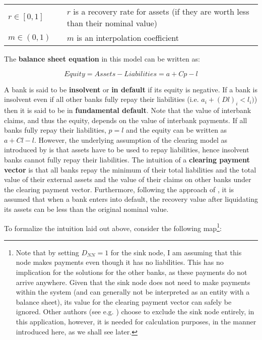 \documentclass[authoryear,12pt]{elsarticle}
\begin{document}
\begin{table}[htp!]
\begin{threeparttable}
\begin{center}
\begin{tabular}{l l p{8cm} }
		 $r \in [0,1]$ & & $r$ is a recovery rate for assets (if they are worth less than their nominal value)\\
         $m \in (0,1)$ & & $m$ is an interpolation coefficient \\


    \bottomrule  
    
\hline
\end{tabular}
\begin{tablenotes}
\item 
\end{tablenotes}
\end{center}
\end{threeparttable}
\end{table}

The \textbf{balance sheet equation} in this model can be written as:

\begin{equation}
Equity = Assets - Liabilities = a + Cp - l
\end{equation}

A bank is said to be \textbf{insolvent} or \textbf{in default} if its equity is negative. If a bank is insolvent even if all other banks fully repay their liabilities (i.e. $a_i + (Dl)_i < l_i)$) then it is said to be in \textbf{fundamental default}. Note that the value of interbank claims, and thus the equity, depends on the value of interbank payments. If all banks fully repay their liabilities, $p=l$ and the equity can be written as $a + Cl - l$. However, the underlying assumption of the clearing model as introduced by \cite{Eisenberg2001} is that assets have to be used to  repay liabilities, hence insolvent banks cannot fully repay their liabilities. The intuition of a \textbf{clearing payment vector} is that all banks repay the minimum of their total liabilities and the total value of their external assets and the value of their claims on other banks under the clearing payment vector. Furthermore, following the approach of \cite{Rogers2013}, it is assumed that when a bank enters into default, the recovery value after liquidating its assets can be less than the original nominal value.


To formalize the intuition laid out above, consider the following map\footnote{Note that by setting $D_{NN}=1$ for the sink node, I am assuming that this node makes payments even though it has no liabilities. This has no implication for the solutions for the other banks, as these payments do not arrive anywhere. Given that the sink node does not need to make payments within the system (and can generally not be interpreted as an entity with a balance sheet), its value for the clearing payment vector can safely be ignored. Other authors (see e.g. \cite{Glasserman2016}) choose to exclude the sink node entirely, in this application, however, it is needed for calculation purposes, in the manner introduced here, as we shall see later.}:
\end{document}
